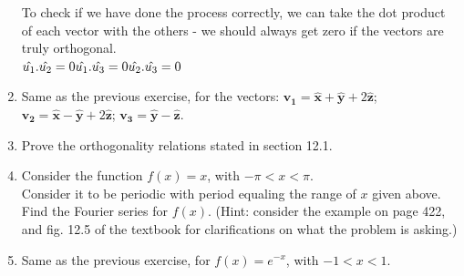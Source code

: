 \documentclass[fleqn]{article}
\begin{document}
\begin{enumerate}
    \textcolor{hwColor}{
      To check if we have done the process correctly, we can take the dot product of each vector with the others - we should always get zero if the vectors are truly orthogonal. \\
      $
        \hat{u_1}.\hat{u_2}=0 \\
        \hat{u_1}.\hat{u_3}=0 \\
        \hat{u_2}.\hat{u_3}=0 \\
      $
    }

    \item  Same as the previous exercise, for the vectors:
      $\mathbf{v_1}=\mathbf{\hat{x}}+\mathbf{\hat{y}}+2\mathbf{\hat{z}}$; $\mathbf{v_2}=\mathbf{\hat{x}}-\mathbf{\hat{y}}+2\mathbf{\hat{z}}$; $\mathbf{v_3}=\mathbf{\hat{y}}-\mathbf{\hat{z}}$.  
      
    \item Prove the orthogonality relations stated in section 12.1.


    \item Consider the function $f(x)=x$,  with $-\pi < x < \pi$. \\
      Consider it to be periodic with period equaling the range of $x$ given above. Find the Fourier series for $f(x)$. (Hint: consider the example on page 422, and fig. 12.5 of the textbook for clarifications on what the problem is asking.)
      
      
    \item Same as the previous exercise, for $f(x)=e^{-x}$,  with $-1 < x < 1$. 
  \end{enumerate}
\end{document}
